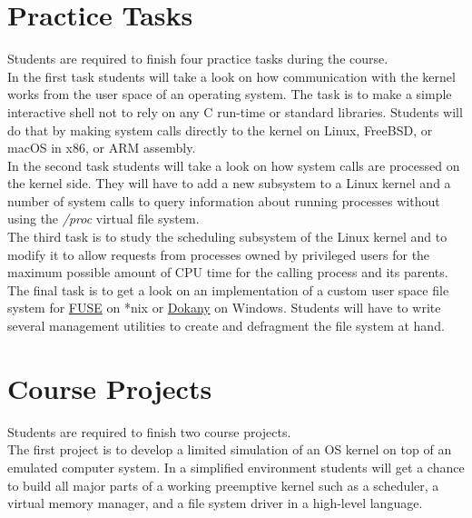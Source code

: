 \documentclass[12pt,a4paper,oneside]{article}
\begin{document}
    \section{Practice Tasks}

        Students are required to finish four practice tasks during the course.\\

        In the first task students will take a look on how communication with
        the kernel works from the user space of an operating system. The task is
        to make a simple interactive shell not to rely on any C run-time or
        standard libraries. Students will do that by making system calls
        directly to the kernel on Linux, FreeBSD, or macOS in x86, or ARM
        assembly.\\

        In the second task students will take a look on how system calls are
        processed on the kernel side. They will have to add a new subsystem to a
        Linux kernel and a number of system calls to query information about
        running processes without using the \textit{/proc} virtual file
        system.\\

        The third task is to study the scheduling subsystem of the Linux kernel
        and to modify it to allow requests from processes owned by privileged
        users for the maximum possible amount of CPU time for the calling
        process and its parents.\\

        The final task is to get a look on an implementation of a custom user
        space file system for \href{https://github.com/libfuse/libfuse}{FUSE}
        on *nix or \href{https://github.com/dokan-dev/dokany}{Dokany} on
        Windows. Students will have to write several management utilities to
        create and defragment the file system at hand.

    \section{Course Projects}

        Students are required to finish two course projects.\\

        The first project is to develop a limited simulation of an OS kernel on
        top of an emulated computer system. In a simplified environment students
        will get a chance to build all major parts of a working preemptive
        kernel such as a scheduler, a virtual memory manager, and a file system
        driver in a high-level language.\\
\end{document}
